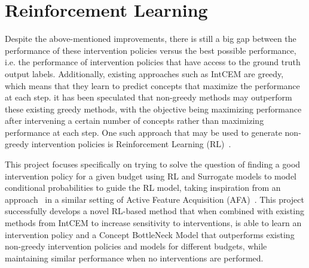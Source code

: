 \documentclass[../main.tex]{subfiles}
\begin{document}
\section{Reinforcement Learning}
Despite the above-mentioned improvements, there is still a big gap between the
performance
of these intervention policies versus the best possible performance, i.e. the performance of 
intervention policies that have access to the ground truth output labels.
Additionally, existing approaches such as IntCEM are greedy, which means that
they learn to predict concepts that maximize the performance at each step.
it has been speculated that non-greedy methods may outperform 
these existing greedy methods, with the objective being maximizing 
performance after intervening a certain number of concepts rather than maximizing 
performance at each step. 
One such approach that may be used to generate non-greedy intervention policies 
is Reinforcement Learning (RL)~\cite{rl}.

This project focuses specifically on trying to solve the 
question of finding a good intervention policy for a given 
budget using RL and Surrogate models to model conditional 
probabilities to guide the RL model, taking inspiration
from an approach~\cite{gsmrl} in a similar setting of
Active Feature Acquisition (AFA)~\cite{afa}.
This project successfully develops a novel RL-based method
that when combined with
existing methods from IntCEM to increase sensitivity
to interventions, is able to learn an intervention policy
and a Concept BottleNeck Model that outperforms
existing 
non-greedy intervention policies and models
for different budgets, while maintaining similar performance
when no interventions are performed.
\end{document}
